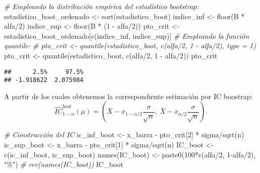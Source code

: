 \documentclass[
]{book}
\newenvironment{Shaded}{\begin{snugshade}}{\end{snugshade}}
\newcommand{\CommentTok}[1]{\textcolor[rgb]{0.56,0.35,0.01}{\textit{#1}}}
\newcommand{\DecValTok}[1]{\textcolor[rgb]{0.00,0.00,0.81}{#1}}
\newcommand{\FunctionTok}[1]{\textcolor[rgb]{0.00,0.00,0.00}{#1}}
\newcommand{\NormalTok}[1]{#1}
\newcommand{\OtherTok}[1]{\textcolor[rgb]{0.56,0.35,0.01}{#1}}
\newcommand{\SpecialCharTok}[1]{\textcolor[rgb]{0.00,0.00,0.00}{#1}}
\newcommand{\StringTok}[1]{\textcolor[rgb]{0.31,0.60,0.02}{#1}}
\theoremstyle{break}
\theoremstyle{definition}
\theoremstyle{definition}
\theoremstyle{definition}
\theoremstyle{definition}
\theoremstyle{remark}
\begin{document}
\begin{Shaded}
\begin{Highlighting}[]
\CommentTok{\# Empleando la distribución empírica del estadístico bootstrap: }
\NormalTok{estadistico\_boot\_ordenado }\OtherTok{\textless{}{-}} \FunctionTok{sort}\NormalTok{(estadistico\_boot)}
\NormalTok{indice\_inf }\OtherTok{\textless{}{-}} \FunctionTok{floor}\NormalTok{(B }\SpecialCharTok{*}\NormalTok{ alfa}\SpecialCharTok{/}\DecValTok{2}\NormalTok{)}
\NormalTok{indice\_sup }\OtherTok{\textless{}{-}} \FunctionTok{floor}\NormalTok{(B }\SpecialCharTok{*}\NormalTok{ (}\DecValTok{1} \SpecialCharTok{{-}}\NormalTok{ alfa}\SpecialCharTok{/}\DecValTok{2}\NormalTok{))}
\NormalTok{pto\_crit }\OtherTok{\textless{}{-}}\NormalTok{ estadistico\_boot\_ordenado[}\FunctionTok{c}\NormalTok{(indice\_inf, indice\_sup)]}
\CommentTok{\# Empleando la función \textasciigrave{}quantile\textasciigrave{}:}
\CommentTok{\# pto\_crit \textless{}{-} quantile(estadistico\_boot, c(alfa/2, 1 {-} alfa/2), type = 1)}
\NormalTok{pto\_crit }\OtherTok{\textless{}{-}} \FunctionTok{quantile}\NormalTok{(estadistico\_boot, }\FunctionTok{c}\NormalTok{(alfa}\SpecialCharTok{/}\DecValTok{2}\NormalTok{, }\DecValTok{1} \SpecialCharTok{{-}}\NormalTok{ alfa}\SpecialCharTok{/}\DecValTok{2}\NormalTok{))}
\NormalTok{pto\_crit}
\end{Highlighting}
\end{Shaded}

\begin{verbatim}
##      2.5%     97.5% 
## -1.918622  2.075984
\end{verbatim}

A partir de los cuales obtenemos la correspondiente estimación por IC
boostrap:
\[\hat{IC}^{boot}_{1-\alpha}\left(  \mu\right)  = 
\left(  \overline{X}-x_{1-\alpha/2}\dfrac{\sigma}{\sqrt{n}},\ \overline{X} 
- x_{\alpha/2}\dfrac{\sigma}{\sqrt{n}} \right).\]

\begin{Shaded}
\begin{Highlighting}[]
\CommentTok{\# Construcción del IC}
\NormalTok{ic\_inf\_boot }\OtherTok{\textless{}{-}}\NormalTok{ x\_barra }\SpecialCharTok{{-}}\NormalTok{ pto\_crit[}\DecValTok{2}\NormalTok{] }\SpecialCharTok{*}\NormalTok{ sigma}\SpecialCharTok{/}\FunctionTok{sqrt}\NormalTok{(n)}
\NormalTok{ic\_sup\_boot }\OtherTok{\textless{}{-}}\NormalTok{ x\_barra }\SpecialCharTok{{-}}\NormalTok{ pto\_crit[}\DecValTok{1}\NormalTok{] }\SpecialCharTok{*}\NormalTok{ sigma}\SpecialCharTok{/}\FunctionTok{sqrt}\NormalTok{(n)}
\NormalTok{IC\_boot }\OtherTok{\textless{}{-}} \FunctionTok{c}\NormalTok{(ic\_inf\_boot, ic\_sup\_boot)}
\FunctionTok{names}\NormalTok{(IC\_boot) }\OtherTok{\textless{}{-}} \FunctionTok{paste0}\NormalTok{(}\DecValTok{100}\SpecialCharTok{*}\FunctionTok{c}\NormalTok{(alfa}\SpecialCharTok{/}\DecValTok{2}\NormalTok{, }\DecValTok{1}\SpecialCharTok{{-}}\NormalTok{alfa}\SpecialCharTok{/}\DecValTok{2}\NormalTok{), }\StringTok{"\%"}\NormalTok{) }\CommentTok{\# rev(names(IC\_boot))}
\NormalTok{IC\_boot}
\end{Highlighting}
\end{Shaded}
\end{document}
